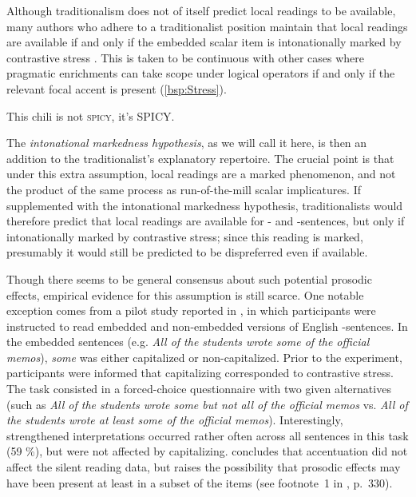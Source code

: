 \documentclass[fleqn,reqno,10pt,draft]{article}
\newcommand{\as}{\acro{as}}
\renewcommand{\es}{\acro{es}}
\begin{document}
Although traditionalism does not of itself predict local readings to
be available, many authors who adhere to a traditionalist position
maintain that local readings are available if and only if the
embedded scalar item is intonationally marked by contrastive stress
\citep[e.g.][]{Horn2006:The-Border-Wars,Geurts2009:Scalar-Implicat,Geurts2010:Quantity-Implic,GeurtsTielvan-Tiel2013:Scalar-expressi}. This
is taken to be continuous with other cases where pragmatic enrichments
can take scope under logical operators if and only if the relevant
focal accent is present (\ref{bsp:Stress}).

\begin{exe}
\ex \label{bsp:Stress} This chili is not \textsc{spicy}, it's \textsc{SPICY}.
\end{exe}

\noindent The \emph{intonational markedness hypothesis}, as we will
call it here, is then an addition to the traditionalist's explanatory
repertoire. The crucial point is that under this extra assumption,
local readings are a marked phenomenon, and not the product of the
same process as run-of-the-mill scalar implicatures. If supplemented
with the intonational markedness hypothesis, traditionalists would
therefore predict that local readings are available for \as- and
\es-sentences, but only if intonationally marked by contrastive
stress; since this reading is marked, presumably it would still be
predicted to be dispreferred even if available.

Though there seems to be general consensus about such potential
prosodic effects, empirical evidence for this assumption is still
scarce. One notable exception comes from a pilot study reported in
\citet{Frazier08}, in which participants were instructed to read
embedded and non-embedded versions of English \as-sentences. In the
embedded sentences (e.g. {\it All of the students wrote some of the
  official memos}), {\it some} was either capitalized or
non-capitalized. Prior to the experiment, participants were informed
that capitalizing corresponded to contrastive stress. The task
consisted in a forced-choice questionnaire with two given alternatives
(such as {\it All of the students wrote some but not all of the
  official memos} vs. {\it All of the students wrote at least some of
  the official memos}). Interestingly, strengthened interpretations
occurred rather often across all sentences in this task (59 \%), but
were not affected by capitalizing.
\citeauthor{Frazier08} concludes that accentuation did not affect the
silent reading data, but raises the possibility that prosodic effects
may have been present at least in a subset of the items (see
footnote~1 in \citet{Frazier08}, p.~330).
\end{document}
